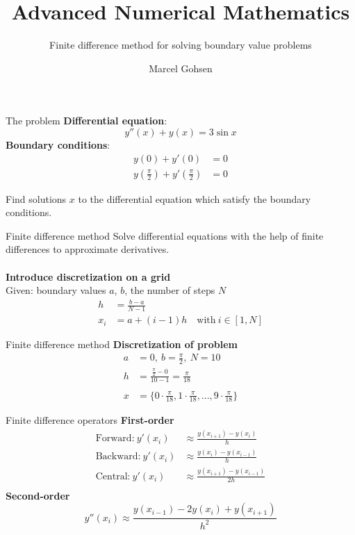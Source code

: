 \documentclass{beamer}
\title{Advanced Numerical Mathematics}
\subtitle{Finite difference method for solving boundary value problems}
\author{Marcel Gohsen}
\institute{Bauhaus-Universit\"at Weimar}
\begin{document}
	\frame{\titlepage}
	
	\begin{frame}{The problem}
		\textbf{Differential equation}: \\
		$$y''(x) + y(x) = 3 \sin x$$ 
		\textbf{Boundary conditions}: \\
		\begin{align*}
			y(0) + y'(0) &= 0\\
			y(\frac{\pi}{2}) + y'(\frac{\pi}{2}) &= 0
		\end{align*}
		
		Find solutions $x$ to the differential equation which satisfy the boundary conditions.
	\end{frame}
	
	\begin{frame}{Finite difference method}
		Solve differential equations with the help of finite differences to approximate derivatives. \\~\\
		
		
		\textbf{Introduce discretization on a grid}\\
		Given: boundary values $a$, $b$, the number of steps $N$  
		\begin{align*}
			h &= \frac{b - a}{N - 1}\\
			x_i &= a + (i - 1)h\quad\text{with}\ i\in[1, N]
		\end{align*}
		
		
		
	\end{frame}
	
	\begin{frame}{Finite difference method}
		\textbf{Discretization of problem}
		\begin{align*}
			a &= 0,\ b= \frac{\pi}{2},\ N = 10\\
			h &= \frac{\frac{\pi}{2} - 0}{10 - 1} = \frac{\pi}{18}\\~\\
			x &= \{0 \cdot \frac{\pi}{18}, 1 \cdot \frac{\pi}{18},\ldots, 9 \cdot \frac{\pi}{18}\}
		\end{align*}
		
	\end{frame}
	
	\begin{frame}{Finite difference operators}
		\textbf{First-order}
		\begin{align*}
			\text{Forward:}\ y'(x_{i}) &\approx \frac{y(x_{i+1}) - y(x_{i})}{h}\\
			\text{Backward:}\ y'(x_{i}) &\approx \frac{y(x_{i}) - y(x_{i-1})}{h}\\
			\text{Central:}\ y'(x_{i}) &\approx \frac{y(x_{i+1}) - y(x_{i-1})}{2h}\\
		\end{align*}
		\textbf{Second-order}
		$$y''(x_i) \approx \frac{y(x_{i-1}) - 2y(x_i) + y(x_{i+1})}{h^2}$$
	\end{frame}
	
\end{document}
